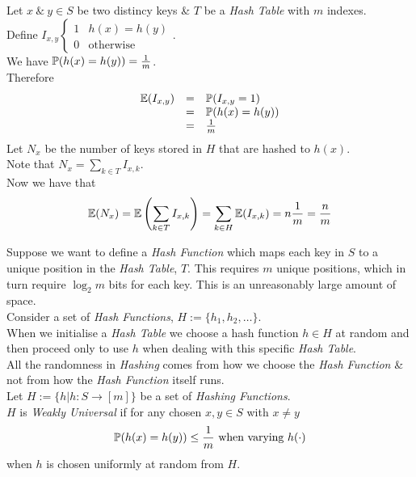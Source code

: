 \documentclass[11pt,a4paper]{article}
\begin{document}
Let $x\ \&\ y\in S$ be two distincy keys \& $T$ be a \textit{Hash Table} with $m$ indexes.\\
Define $I_{x,y}\begin{cases}1&h(x)=h(y)\\0&\text{otherwise}\end{cases}$.\\
We have $\mathbb{P}(h(x)=h(y))=\frac{1}{m}$.\\
Therefore
\[\begin{array}{rcl}
\mathbb{E}(I_{x,y})&=&\mathbb{P}(I_{x,y}=1)\\
&=&\mathbb{P}(h(x)=h(y))\\
&=&\frac{1}{m}
\end{array}\]
Let $N_x$ be the number of keys stored in $H$ that are hashed to $h(x)$.\\
Note that $N_x=\displaystyle\sum_{k\in T}I_{x,k}$.\\
Now we have that
$$\mathbb{E}(N_x)=\mathbb{E}\left(\displaystyle\sum_{k\in T}I_{x,k}\right)=\sum_{k\in H}\mathbb{E}(I_{x,k})=n\frac{1}{m}=\frac{n}{m}$$
\proved

Suppose we want to define a \textit{Hash Function} which maps each key in $S$ to a unique position in the \textit{Hash Table}, $T$. This requires $m$ unique positions, which in turn require $\log_2 m$ bits for each key. This is an unreasonably large amount of space.\\

Consider a set of \textit{Hash Functions}, $H:=\{h_1,h_2,\dots\}$.\\
When we initialise a \textit{Hash Table} we choose a hash function $h\in H$ at random and then proceed only to use $h$ when dealing with this specific \textit{Hash Table}.\\

All the randomness in \textit{Hashing} comes from how we choose the \textit{Hash Function} \& not from how the \textit{Hash Function} itself runs.\\

Let $H:=\{h|h:S\to[m]\}$ be a set of \textit{Hashing Functions}.\\
$H$ is \textit{Weakly Universal} if for any chosen $x,y\in S$ with $x\neq y$
$$\mathbb{P}(h(x)=h(y))\leq\frac{1}{m}\text{ when varying }h(\cdot)$$
when $h$ is chosen uniformly at random from $H$.\\
\end{document}
